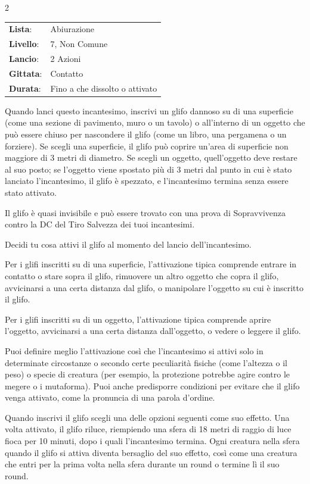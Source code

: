 \begin{multicols}{2}
\noindent\begin{tabularx}{\linewidth}{p{1.9cm}X}
	\rowcolor{gray!20}\textbf{Lista}: & Abiurazione \\
	\textbf{Livello}: & 7, Non Comune \\
	\rowcolor{gray!20}\textbf{Lancio}: & 2 Azioni \\
	\textbf{Gittata}: & Contatto \\
	\rowcolor{gray!20}\textbf{Durata}: & Fino a che dissolto o attivato \\
\end{tabularx}\smallskip

Quando lanci questo incantesimo, inscrivi un glifo dannoso su di una superficie (come una sezione di pavimento, muro o un tavolo) o all'interno di un oggetto che può essere chiuso per nascondere il glifo (come un libro, una pergamena o un forziere). Se scegli una superficie, il glifo può coprire un'area di superficie non maggiore di 3 metri di diametro. Se scegli un oggetto, quell'oggetto deve restare al suo posto; se l'oggetto viene spostato più di 3 metri dal punto in cui è stato lanciato l'incantesimo, il glifo è spezzato, e l'incantesimo termina senza essere stato attivato.

Il glifo è quasi invisibile e può essere trovato con una prova di Sopravvivenza contro la DC del Tiro Salvezza dei tuoi incantesimi.

Decidi tu cosa attivi il glifo al momento del lancio dell'incantesimo.

Per i glifi inscritti su di una superficie, l'attivazione tipica comprende entrare in contatto o stare sopra il glifo, rimuovere un altro oggetto che copra il glifo, avvicinarsi a una certa distanza dal glifo, o manipolare l'oggetto su cui è inscritto il glifo.

Per i glifi inscritti su di un oggetto, l'attivazione tipica comprende aprire l'oggetto, avvicinarsi a una certa distanza dall'oggetto, o vedere o leggere il glifo.

Puoi definire meglio l'attivazione così che l'incantesimo si attivi solo in determinate circostanze o secondo certe peculiarità fisiche (come l'altezza o il peso) o specie di creatura (per esempio, la protezione potrebbe agire contro le megere o i mutaforma). Puoi anche predisporre condizioni per evitare che il glifo venga attivato, come la pronuncia di una parola d'ordine.

Quando inscrivi il glifo scegli una delle opzioni seguenti come suo effetto. Una volta attivato, il glifo riluce, riempiendo una sfera di 18 metri di raggio di luce fioca per 10 minuti, dopo i quali l'incantesimo termina. Ogni creatura nella sfera quando il glifo si attiva diventa bersaglio del suo effetto, così come una creatura che entri per la prima volta nella sfera durante un round o termine lì il suo round.


\end{multicols}
